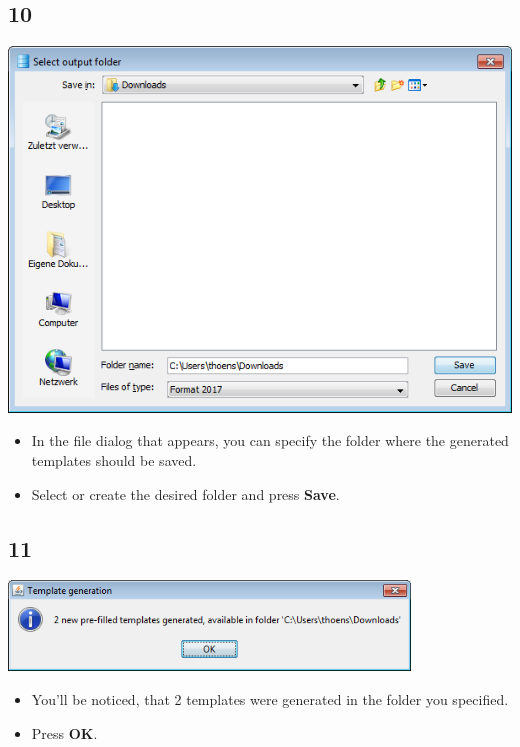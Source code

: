 \documentclass{beamer}
\begin{document}
\subsection{10}
\begin{frame}
	\begin{center}
  		\includegraphics[height=0.5\textheight]{10.png}
	\end{center}
	\begin{itemize}
		\item In the file dialog that appears, you can specify the folder where the generated templates should be saved.
		\item Select or create the desired folder and press \textbf{Save}.
	\end{itemize}
\end{frame}

\subsection{11}
\begin{frame}
	\begin{center}
  		\includegraphics[width=0.8\textwidth]{11.png}
	\end{center}
	\begin{itemize}
		\item You'll be noticed, that 2 templates were generated in the folder you specified.
		\item Press \textbf{OK}.
	\end{itemize}
\end{frame}
\end{document}
